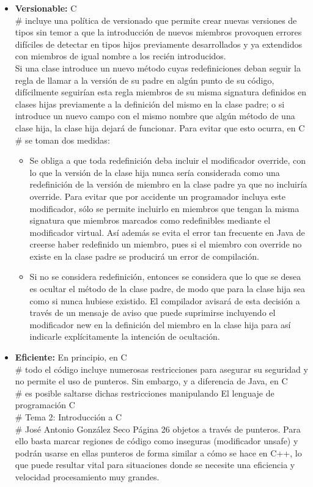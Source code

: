 \begin{itemize}
	\item \textbf{Versionable: } C\\# incluye una pol\'itica de versionado que permite crear nuevas versiones de tipos sin temor a que la introducci\'on de nuevos miembros provoquen errores dif\'iciles de detectar en tipos hijos previamente desarrollados y ya extendidos con miembros de igual nombre a los reci\'en introducidos.\\

	Si una clase introduce un nuevo m\'etodo cuyas redefiniciones deban seguir la regla de llamar a la versi\'on de su padre en alg\'un punto de su c\'odigo, dif\'icilmente seguir\'ian esta regla miembros de su misma signatura definidos en clases hijas previamente a la definici\'on del mismo en la clase padre; o si introduce un nuevo campo con el mismo nombre que alg\'un m\'etodo de una clase hija, la clase hija dejar\'a de funcionar. Para evitar que esto ocurra, en C\\# se toman dos medidas: 
	\begin{itemize}
		\item Se obliga a que toda redefinici\'on deba incluir el modificador override, con lo que la versi\'on de la clase hija nunca ser\'ia considerada como una redefinici\'on de la versi\'on de miembro en la clase padre ya que no incluir\'ia override. Para evitar que por accidente un programador incluya este modificador, s\'olo se permite incluirlo en miembros que tengan la misma signatura que miembros marcados como redefinibles mediante el modificador virtual. As\'i adem\'as se evita el error tan frecuente en Java de creerse haber redefinido un miembro, pues si el miembro con override no existe en la clase padre se producir\'a un error de compilaci\'on. 

		\item Si no se considera redefinici\'on, entonces se considera que lo que se desea es ocultar el m\'etodo de la clase padre, de modo que para la clase hija sea como si nunca hubiese existido. El compilador avisar\'a de esta decisi\'on a trav\'es de un mensaje de aviso que puede suprimirse incluyendo el modificador new en la definici\'on del miembro en la clase hija para as\'i indicarle expl\'icitamente la intenci\'on de ocultaci\'on. 
	\end{itemize}

	\item \textbf{Eficiente: } En principio, en C\\# todo el c\'odigo incluye numerosas restricciones para asegurar su seguridad y no permite el uso de punteros. Sin embargo, y a diferencia de Java, en C\\# es posible saltarse dichas restricciones manipulando El lenguaje de programaci\'on C\\# Tema 2: Introducci\'on a C\\# Jos\'e Antonio Gonz\'alez Seco P\'agina 26 objetos a trav\'es de punteros. Para ello basta marcar regiones de c\'odigo como inseguras (modificador unsafe) y podr\'an usarse en ellas punteros de forma similar a c\'omo se hace en C++, lo que puede resultar vital para situaciones donde se necesite una eficiencia y velocidad procesamiento muy grandes. 


\end{itemize}
